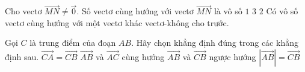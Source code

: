 


\begin{ex}%
	Cho vectơ $\overrightarrow{MN}\neq \overrightarrow{0}$. Số vectơ cùng hướng với vectơ $\overrightarrow{MN}$ là
	\choice
	{\True vô số}
	{$1$}
	{$3$}
	{$2$}
	\loigiai
	{Có vô số vectơ cùng hướng với một vectơ khác vectơ-không cho trước.}
\end{ex}

\begin{ex}%
	Gọi $ C $ là trung điểm của đoạn $ AB $. Hãy chọn khẳng định đúng trong các khẳng định sau.
	\choice
	{$ \overrightarrow{CA}=\overrightarrow{CB} $}
	{\True $ \overrightarrow{AB} $ và $ \overrightarrow{AC} $ cùng hướng}
	{$ \overrightarrow{AB} $ và $ \overrightarrow{CB} $ ngược hướng}
	{$ \left|\overrightarrow{AB}\right|=\overrightarrow{CB} $}
\end{ex}


